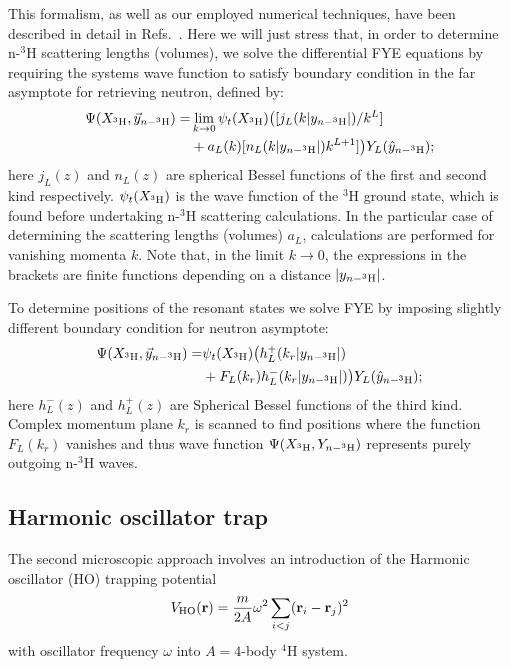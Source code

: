 \documentclass[5p,times]{elsarticle}
\begin{document}
This formalism, as well as our employed numerical techniques, have been described in detail in Refs.~\cite{Lazauskas:2004hq,Lazauskas:2019hil}.
Here we will just stress that, in order to determine n-$^3$H scattering lengths (volumes), we solve the differential FYE equations by requiring the systems wave function to satisfy boundary condition in the far asymptote for retrieving neutron, defined by:
%
\begin{equation}
\begin{split}
\Psi(X_{^3{\rm H}},\vec{y}_{n-^3{\rm H}})=&\lim_{k\rightarrow0}\psi_t(X_{^3{\rm H}})\big([j_L(k|y_{n-^3{\rm H}}|)/k^{L}]\\
&+a_L(k) [n_L(k|y_{n-^3{\rm H}}|)k^{L+1}]\big)Y_L(\hat{y}_{n-^3{\rm H}});  \label{eq:FYe_a}
\end{split}
\end{equation}
%
here $j_L(z)$ and $n_L(z)$ are spherical Bessel functions of the first and second kind respectively. 
$\psi_t(X_{^3{\rm H}})$ is the wave function of the $^3$H ground state, which is found before undertaking n-$^3$H scattering calculations. 
In the particular case of determining the scattering lengths (volumes) $a_L$, calculations are performed for vanishing momenta $k$.
Note that, in the limit $k\rightarrow0$, the expressions in the brackets are finite functions depending on a distance $|y_{n-^3{\rm H}}|$.

To determine positions of the resonant states we solve FYE by imposing slightly different boundary condition for neutron asymptote:
\begin{equation}
\begin{split}
\Psi(X_{^3{\rm H}},\vec{y}_{n-^3{\rm H}})=&\psi_t(X_{^3{\rm H}}) \big(h_L^+(k_{r}|y_{n-^3{\rm H}}|)\\
&+F_L(k_r)h_L^-(k_{r}|y_{n-^3{\rm H}}|)\big) Y_L(\hat{y}_{n-^3{\rm H}});  \label{eq:FYe_res}
\end{split}
\end{equation}
here $h_L^-(z)$ and $h_L^+(z)$ are Spherical Bessel functions of the third kind. Complex momentum plane $k_r$ is scanned to find positions where the function $F_L(k_r)$ vanishes and thus wave function $\Psi(X_{^3{\rm H}},Y_{n-^3{\rm H}})$ represents purely outgoing n-$^3$H waves.
 
\subsection{Harmonic oscillator trap}
The second microscopic approach involves an introduction of the Harmonic oscillator (HO) trapping potential
\begin{equation}
    V_{\rm HO}(\textbf{r}) = \frac{m}{2A} \omega^2 \sum_{i<j} (\textbf{r}_i - \textbf{r}_j)^2
\end{equation}
with oscillator frequency $\omega$ into $A=4$-body $^4$H system.
\end{document}
